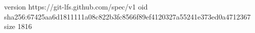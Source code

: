 version https://git-lfs.github.com/spec/v1
oid sha256:67425aa6d1811111a08c822b3fc8566f89ef4120327a55241e373ed0a4712367
size 1816
